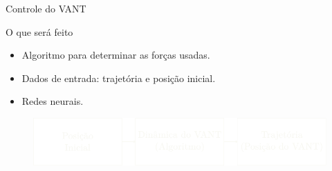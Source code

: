 \begin{frame}{Controle do VANT}

\begin{block}{O que será feito}
    \begin{itemize}
        \item Algoritmo para determinar as forças usadas.
        \item Dados de entrada: trajetória e posição inicial.
        \item Redes neurais.
    \end{itemize} 
\end{block}
\begin{figure}
\centering
\includegraphics{figures/dinamica_vant.pdf}
\end{figure}
\end{frame}